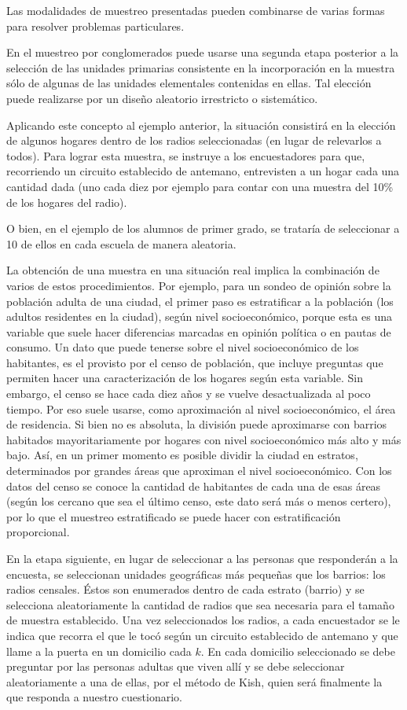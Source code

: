 \documentclass[]{book}
\begin{document}
Las modalidades de muestreo presentadas pueden combinarse de varias
formas para resolver problemas particulares.

En el muestreo por conglomerados puede usarse una segunda etapa
posterior a la selección de las unidades primarias consistente en la
incorporación en la muestra sólo de algunas de las unidades elementales
contenidas en ellas. Tal elección puede realizarse por un diseño
aleatorio irrestricto o sistemático.

Aplicando este concepto al ejemplo anterior, la situación consistirá en
la elección de algunos hogares dentro de los radios seleccionadas (en
lugar de relevarlos a todos). Para lograr esta muestra, se instruye a
los encuestadores para que, recorriendo un circuito establecido de antemano, entrevisten
a un hogar cada una cantidad dada (uno cada diez por ejemplo para contar
con una muestra del 10\% de los hogares del radio).

O bien, en el ejemplo de los alumnos de primer grado, se trataría de
seleccionar a 10 de ellos en cada escuela de manera aleatoria.

La obtención de una muestra en una situación real implica la combinación de varios de estos procedimientos. Por ejemplo, para un sondeo de
opinión sobre la población adulta de una ciudad, el primer paso es
estratificar a la población (los adultos residentes en la ciudad), según nivel socioeconómico, porque esta es una variable que suele hacer diferencias marcadas en opinión política o en pautas de consumo. Un dato que puede tenerse sobre el nivel socioeconómico de los habitantes, es el
provisto por el censo de población, que incluye preguntas que permiten
hacer una caracterización de los hogares según esta variable. Sin
embargo, el censo se hace cada diez años y se vuelve desactualizada al
poco tiempo. Por eso suele usarse, como aproximación al nivel
socioeconómico, el área de residencia. Si bien no es absoluta, la
división puede aproximarse con barrios habitados mayoritariamente por
hogares con nivel socioeconómico más alto y más bajo. Así, en un primer
momento es posible dividir la ciudad en estratos, determinados por
grandes áreas que aproximan el nivel socioeconómico. Con los datos del censo se conoce la cantidad de habitantes de cada una de esas áreas (según los cercano que sea el último censo, este dato será más o menos certero), por lo que el muestreo estratificado se puede hacer con estratificación proporcional.

En la etapa siguiente, en lugar de seleccionar a las personas que
responderán a la encuesta, se seleccionan unidades geográficas más pequeñas que los barrios: los radios censales. Éstos son enumerados dentro de cada estrato (barrio) y se selecciona aleatoriamente la cantidad de radios que sea necesaria para el tamaño de muestra establecido. Una vez seleccionados los radios, a cada encuestador se le indica que recorra el que le tocó según un circuito establecido de antemano y que llame a la puerta en un domicilio cada \(k\). En cada domicilio seleccionado se debe preguntar por las personas adultas que viven allí y se debe seleccionar aleatoriamente a una de ellas, por el método de Kish, quien será finalmente la que responda a nuestro cuestionario.
\end{document}
